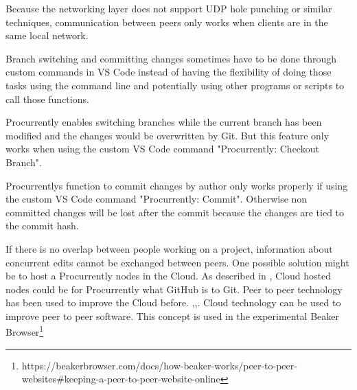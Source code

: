 Because the networking layer does not support UDP hole punching\cite{10.1007/978-3-642-20798-3_1} or similar techniques, communication between peers only works when clients are in the same local network.

Branch switching and committing changes sometimes have to be done through custom commands in VS Code instead of having the flexibility of doing those tasks using the command line and potentially using other programs or scripts to call those functions.

Procurrently enables switching branches while the current branch has been modified and the changes would be overwritten by Git. But this feature only works when using the custom VS Code command "Procurrently: Checkout Branch".

Procurrentlys function to commit changes by author only works properly if using the custom VS Code command "Procurrently: Commit". Otherwise non committed changes will be lost after the commit because the changes are tied to the commit hash.

If there is no overlap between people working on a project, information about concurrent edits cannot be exchanged between peers.
One possible solution might be to host a Procurrently nodes in the Cloud. As described in \cite{6188603}, Cloud hosted nodes could be for Procurrently what GitHub is to Git. 
Peer to peer technology has been used to improve the Cloud before. \cite{Ranjan2013},\cite{Ranjan2010},\cite{Babaoglu:2012:DIP:2245276.2245357}. Cloud technology can be used to improve peer to peer software. This concept is used in the experimental Beaker Browser\footnote{https://beakerbrowser.com/docs/how-beaker-works/peer-to-peer-websites\#keeping-a-peer-to-peer-website-online}